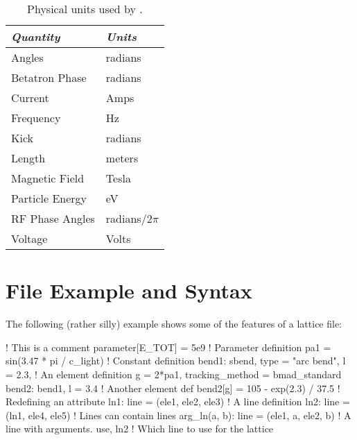 \begin{table}[ht]
\centering
\begin{tabular}{ll} \toprule
  {\em Quantity}     & {\em Units}       \\ \midrule
  Angles             &    radians        \\ 
  Betatron Phase     &    radians        \\
  Current            &    Amps           \\ 
  Frequency          &    Hz             \\ 
  Kick               &    radians        \\ 
  Length             &    meters         \\ 
  Magnetic Field     &    Tesla          \\ 
  Particle Energy    &    eV             \\ 
  RF Phase Angles    &    radians/2$\pi$ \\ 
  Voltage            &    Volts          \\ \bottomrule
\end{tabular}
\caption{Physical units used by \bmad.}
\label{t:units}
\end{table}

\section{File Example and Syntax}

The following (rather silly) example shows some of the features of a
\bmad lattice file:
\begin{example}
  ! This is a comment
  parameter[E_TOT] = 5e9                   ! Parameter definition
  pa1 = sin(3.47 * pi / c_light)                 ! Constant definition
  bend1: sbend, type = "arc bend", l = 2.3,      ! An element definition
      g = 2*pa1, tracking_method = bmad_standard
  bend2: bend1, l = 3.4                          ! Another element def
  bend2[g] = 105 - exp(2.3) / 37.5               ! Redefining an attribute
  ln1: line = (ele1, ele2, ele3)                 ! A line definition
  ln2: line = (ln1, ele4, ele5)                  ! Lines can contain lines
  arg_ln(a, b): line = (ele1, a, ele2, b)        ! A line with arguments.
  use, ln2                                       ! Which line to use for the lattice
\end{example}

